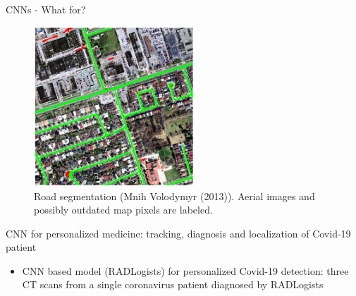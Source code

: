 \begin{vbframe}{CNNs - What for?}
\begin{figure}
  \end{figure}
\framebreak
  \begin{figure}
    \centering
    \includegraphics[width=6cm]{plots/01_introduction/road_seg.png}
    \caption{Road segmentation (Mnih Volodymyr (2013)). Aerial images and possibly outdated map pixels are labeled.}
  \end{figure}
\framebreak
\begin{figure}
  \centering
\end{figure}

{CNN for personalized medicine: tracking, diagnosis and localization of Covid-19 patient}
  \begin{itemize}
    \item CNN based model (RADLogists) for personalized Covid-19 detection: three CT scans from a single coronavirus patient diagnosed by RADLogists 
  \end{itemize}
  

\end{vbframe}

